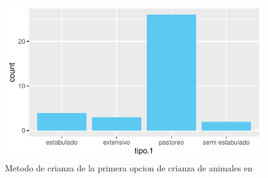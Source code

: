 \documentclass[12pt]{article}\usepackage[]{graphicx}\usepackage[]{xcolor}
\makeatletter
\def\maxwidth{ %
  \ifdim\Gin@nat@width>\linewidth
    \linewidth
  \else
    \Gin@nat@width
  \fi
}
\newenvironment{knitrout}{}{} %
\makeatother
\begin{document}
	\begin{figure}[H]
	\centering
\begin{knitrout}
\color{fgcolor}
\includegraphics[width=\maxwidth]{figure/seventeen-1} 
\end{knitrout}
	\caption{Metodo de crianza de la primera opcion de crianza de animales en \comunidad}
	\end{figure}
	
\end{document}
